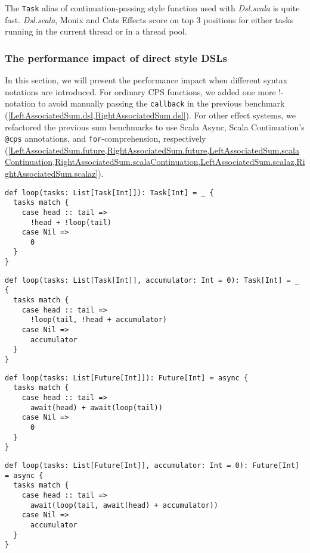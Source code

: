 The \lstinline{Task} alias of continuation-passing style function used with \textit{Dsl.scala} is quite fast. \textit{Dsl.scala}, Monix and Cats Effects score on top 3 positions for either tasks running in the current thread or in a thread pool.

\subsubsection{The performance impact of direct style DSLs}\label{The performance impact of direct style DSLs}

In this section, we will present the performance impact when different syntax notations are introduced. For ordinary CPS functions, we added one more !-notation to avoid manually passing the \lstinline{callback} in the previous benchmark (\cref{LeftAssociatedSum.dsl,RightAssociatedSum.dsl}). For other effect systems, we refactored the previous sum benchmarks to use Scala Async, Scala Continuation's \lstinline{@cps} annotations, and \lstinline{for}-comprehension, respectively (\cref{LeftAssociatedSum.future,RightAssociatedSum.future,LeftAssociatedSum.scalaContinuation,RightAssociatedSum.scalaContinuation,LeftAssociatedSum.scalaz,RightAssociatedSum.scalaz}).

\begin{lstlisting}[float=htbp,caption={Left-associated sum based on LDKs of \textit{Dsl.scala}},label={LeftAssociatedSum.dsl}]
def loop(tasks: List[Task[Int]]): Task[Int] = _ {
  tasks match {
    case head :: tail =>
      !head + !loop(tail)
    case Nil =>
      0
  }
}
\end{lstlisting}

\begin{lstlisting}[float=htbp,caption={Right-associated sum based on LDKs of \textit{Dsl.scala}},label={RightAssociatedSum.dsl}]
def loop(tasks: List[Task[Int]], accumulator: Int = 0): Task[Int] = _ {
  tasks match {
    case head :: tail =>
      !loop(tail, !head + accumulator)
    case Nil =>
      accumulator
  }
}
\end{lstlisting}

\begin{lstlisting}[float=htbp,caption={Left-associated sum based on Scala Async},label={LeftAssociatedSum.future}]
def loop(tasks: List[Future[Int]]): Future[Int] = async {
  tasks match {
    case head :: tail =>
      await(head) + await(loop(tail))
    case Nil =>
      0
  }
}
\end{lstlisting}

\begin{lstlisting}[float=htbp,caption={Right-associated sum based on Scala Async},label={RightAssociatedSum.future}]
def loop(tasks: List[Future[Int]], accumulator: Int = 0): Future[Int] = async {
  tasks match {
    case head :: tail =>
      await(loop(tail, await(head) + accumulator))
    case Nil =>
      accumulator
  }
}
\end{lstlisting}

